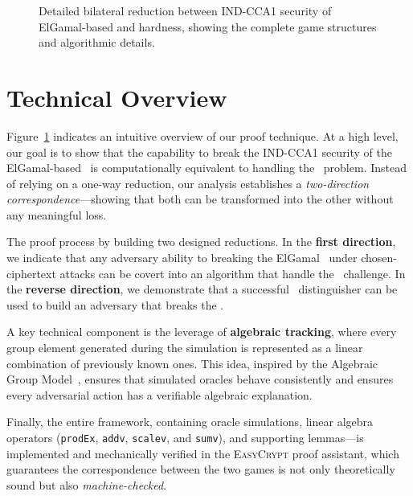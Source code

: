 \begin{figure}[H]
\caption{Detailed bilateral reduction between IND-CCA1 security of ElGamal-based \KEM and \qDDH hardness, showing the complete game structures and algorithmic details.}
\label{fig:detailed-bilateral-reduction}
\end{figure}




\section{Technical Overview}

Figure~\ref{fig:detailed-bilateral-reduction} indicates an intuitive overview of our proof technique.
At a high level, our goal is to show that the capability to break the IND-CCA1 security of the ElGamal-based \KEM\ is computationally equivalent to handling the \qDDH\ problem. 
Instead of relying on a one-way reduction, our analysis establishes a \emph{two-direction correspondence}—showing that both can be transformed into the other without any meaningful loss.

The proof process by building two designed reductions. 
In the \textbf{first direction}, we indicate that any adversary ability to breaking the ElGamal \KEM\ under chosen-ciphertext attacks can be covert into an algorithm that handle the \qDDH\ challenge. 
In the \textbf{reverse direction}, we demonstrate that a successful \qDDH\ distinguisher can be used to build an adversary that breaks the \KEM.

A key technical component is the leverage of \textbf{algebraic tracking}, where every group element generated during the simulation is represented as a linear combination of previously known ones. 
This idea, inspired by the Algebraic Group Model~\cite{cong2022}, ensures that simulated oracles behave consistently and ensures every adversarial action has a verifiable algebraic explanation.

Finally, the entire framework, containing oracle simulations, linear algebra operators (\texttt{prodEx}, \texttt{addv}, \texttt{scalev}, and \texttt{sumv}), and supporting lemmas—is implemented and mechanically verified in the \textsc{EasyCrypt} proof assistant, which guarantees the correspondence between the two games is not only theoretically sound but also \emph{machine-checked}.


